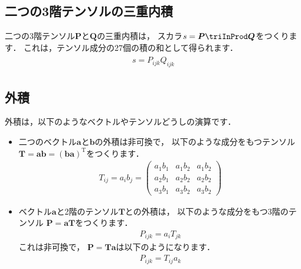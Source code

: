 \subsection{二つの3階テンソルの三重内積}
\label{ssec:1.3.3}
二つの3階テンソル$\bm{P}$と$\bm{Q}$の三重内積は，
スカラ$s = \bm{P} \triInProd \bm{Q}$をつくります．
これは，テンソル成分の27個の積の和として得られます．
\begin{align}
 \label{eq:1.18}
 \begin{aligned}
  s = P_{ijk}Q_{ijk}
 \end{aligned}
\end{align}


\subsection{外積}
\label{ssec:1.3.4}
外積は，以下のようなベクトルやテンソルどうしの演算です．
\begin{itemize}
 \item 二つのベクトル$\bm{a}$と$\bm{b}$の外積は非可換で，
       以下のような成分をもつテンソル
       $\bm{T} = \bm{a}\bm{b} = (\bm{b}\bm{a})^{\mathrm{T}}$をつくります．
       \begin{align}
        \label{eq:1.19}
        T_{ij} = a_{i}b_{j} =
        \begin{pmatrix}
         a_{1}b_{1} & a_{1}b_{2} & a_{1}b_{2} \\
         a_{2}b_{1} & a_{2}b_{2} & a_{2}b_{2} \\
         a_{3}b_{1} & a_{3}b_{2} & a_{3}b_{2}
        \end{pmatrix}
       \end{align}
 \item ベクトル$\bm{a}$と2階のテンソル$\bm{T}$との外積は，
       以下のような成分をもつ3階のテンソル
       $\bm{P} = \bm{a}\bm{T}$をつくります．
       \begin{align}
        \label{eq:1.20}
        P_{ijk} = a_{i}T_{jk}
       \end{align}
       これは非可換で，
       $\bm{P} = \bm{T}\bm{a}$は以下のようになります．
       \begin{align}
        \label{eq:1.21}
        P_{ijk} = T_{ij}a_{k}
       \end{align}
\end{itemize}


